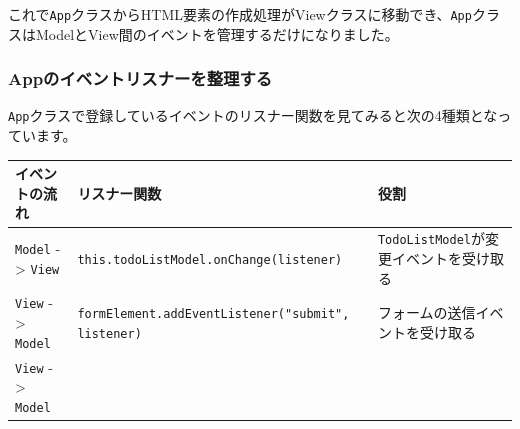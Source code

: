 これで\texttt{App}クラスからHTML要素の作成処理がViewクラスに移動でき、\texttt{App}クラスはModelとView間のイベントを管理するだけになりました。

\hypertarget{app-event-listener}{%
\subsubsection{Appのイベントリスナーを整理する}\label{app-event-listener}}

\texttt{App}クラスで登録しているイベントのリスナー関数を見てみると次の4種類となっています。

\begin{longtable}[]{@{}lll@{}}
\toprule
\begin{minipage}[b]{0.15\columnwidth}\raggedright
イベントの流れ\strut
\end{minipage} & \begin{minipage}[b]{0.43\columnwidth}\raggedright
リスナー関数\strut
\end{minipage} & \begin{minipage}[b]{0.34\columnwidth}\raggedright
役割\strut
\end{minipage}\tabularnewline
\midrule
\endhead
\begin{minipage}[t]{0.15\columnwidth}\raggedright
\texttt{Model} -\textgreater{}
\texttt{View}\strut
\end{minipage} & \begin{minipage}[t]{0.43\columnwidth}\raggedright
\texttt{this.todoListModel.onChange(listener)}\strut
\end{minipage} & \begin{minipage}[t]{0.34\columnwidth}\raggedright
\texttt{TodoListModel}が変更イベントを受け取る\strut
\end{minipage}\tabularnewline
\begin{minipage}[t]{0.15\columnwidth}\raggedright
\texttt{View} -\textgreater{}
\texttt{Model}\strut
\end{minipage} & \begin{minipage}[t]{0.43\columnwidth}\raggedright
\texttt{formElement.addEventListener("submit", listener)}\strut
\end{minipage} & \begin{minipage}[t]{0.34\columnwidth}\raggedright
フォームの送信イベントを受け取る\strut
\end{minipage}\tabularnewline
\begin{minipage}[t]{0.15\columnwidth}\raggedright
\texttt{View} -\textgreater{}
\texttt{Model}\strut
\end{minipage} & \begin{minipage}[t]{0.43\columnwidth}\raggedright

\end{minipage}
\end{longtable}
